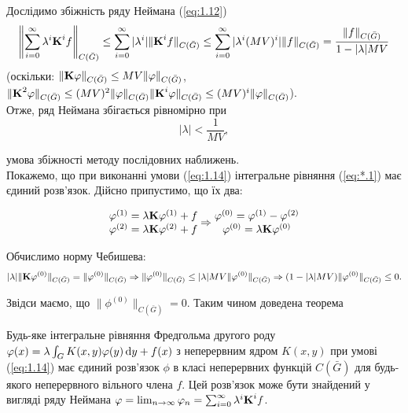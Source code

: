 Дослідимо збіжність ряду Неймана (\ref{eq:1.12})
\begin{equation}
	\label{eq:1.13}
	\left\| \Sum_{i = 0}^\infty \lambda^i \bf{K}^i f \right\|_{C(\bar G)} \le \Sum_{i = 0}^\infty |\lambda^i| \| \bf{K}^i f \|_{C(\bar G)} \le \Sum_{i = 0}^\infty |\lambda^i(MV)^i| \| f \|_{C(\bar G)} = \dfrac{\|f\|_{C(\bar G)}}{1 - |\lambda| MV}
\end{equation}
(оскільки: $\| \bf{K} \phi\|_{C(\bar G)} \le MV \|\phi\|_{C(\bar G)}$, $\|\bf{K}^2\phi\|_{C(\bar G)} \le (MV)^2 \|\phi\|_{C(\bar G)}\|\bf{K}^i\phi\|_{C(\bar G)} \le (MV)^i \|\phi\|_{C(\bar G)}$). \\

Отже, ряд Неймана збігається рівномірно при 
\begin{equation}
	\label{eq:1.14}
	|\lambda| < \dfrac{1}{MV},
\end{equation} 

умова збіжності методу послідовних наближень. \\

Покажемо, що при виконанні умови (\ref{eq:1.14}) інтегральне рівняння (\ref{eq:*.1}) має єдиний розв’язок. Дійсно припустимо, що їх два:

\begin{equation*}
	\begin{matrix}
		\phi^{(1)} = \lambda \bf{K} \phi^{(1)} + f \\
		\phi^{(2)} = \lambda \bf{K} \phi^{(2)} + f
	\end{matrix}
	\Rightarrow
	\begin{matrix}
		\phi^{(0)} = \phi^{(1)} - \phi^{(2)}  \\
		\phi^{(0)} = \lambda \bf{K} \phi^{(0)}
	\end{matrix}
\end{equation*}

Обчислимо норму Чебишева: \[ |\lambda| \|\bf{K} \phi^{(0)}\|_{C(\bar G)} = \| \phi^{(0)} \|_{C(\bar G)} \Rightarrow \| \phi^{(0)} \|_{C(\bar G)} \le |\lambda| MV \|\phi^{(0)}\|_{C(\bar G)} \Rightarrow (1 - |\lambda|MV)\|\phi^{(0)}\|_{C(\bar G)} \le 0. \]

Звідси маємо, що $\|\phi^{(0)}\|_{C(\bar G)} = 0$. Таким чином доведена теорема

\begin{theorem}
	Будь-яке інтегральне рівняння Фредгольма другого роду $\phi(x) = \lambda \int_G K(x, y) \phi(y) \diff y + f(x)$ з неперервним ядром $K(x, y)$ при умові (\ref{eq:1.14}) має єдиний розв’язок $\phi$ в класі неперервних функцій $C(\bar G)$ для будь-якого неперервного вільного члена $f$. Цей розв’язок може бути знайдений у вигляді ряду Неймана $\phi = \lim_{n \to \infty} \phi_n = \sum_{i = 0}^\infty \lambda^i \bf{K}^i f$.
\end{theorem}

